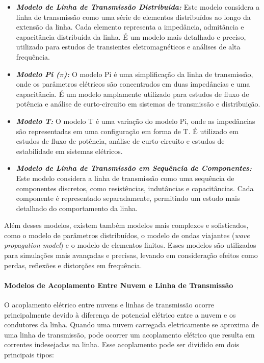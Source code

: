 \documentclass[a4paper, 12pt, onecolumn,singlespacing]{article}
\begin{document}
		\begin{itemize}
			\item \textbf{\textit{Modelo de Linha de Transmissão Distribuída:}} Este modelo considera a linha de transmissão como uma série de elementos distribuídos ao longo da extensão da linha. Cada elemento representa a impedância, admitância e capacitância distribuída da linha. É um modelo mais detalhado e preciso, utilizado para estudos de transientes eletromagnéticos e análises de alta frequência.
			
			\item \textbf{\textit{Modelo Pi ($\pi$):}} O modelo Pi é uma simplificação da linha de transmissão, onde os parâmetros elétricos são concentrados em duas impedâncias e uma capacitância. É um modelo amplamente utilizado para estudos de fluxo de potência e análise de curto-circuito em sistemas de transmissão e distribuição.
			
			\item \textbf{\textit{Modelo T:}} O modelo T é uma variação do modelo Pi, onde as impedâncias são representadas em uma configuração em forma de T. É utilizado em estudos de fluxo de potência, análise de curto-circuito e estudos de estabilidade em sistemas elétricos.
			
			\item \textbf{\textit{Modelo de Linha de Transmissão em Sequência de Componentes:}} Este modelo considera a linha de transmissão como uma sequência de componentes discretos, como resistências, indutâncias e capacitâncias. Cada componente é representado separadamente, permitindo um estudo mais detalhado do comportamento da linha.
		\end{itemize}
		
		Além desses modelos, existem também modelos mais complexos e sofisticados, como o modelo de parâmetros distribuídos, o modelo de ondas viajantes (\textit{wave propagation model}) e o modelo de elementos finitos. Esses modelos são utilizados para simulações mais avançadas e precisas, levando em consideração efeitos como perdas, reflexões e distorções em frequência.
		
		\paragraph{Modelos de Acoplamento Entre Nuvem e Linha de Transmissão}
		
		O acoplamento elétrico entre nuvens e linhas de transmissão ocorre principalmente devido à diferença de potencial elétrico entre a nuvem e os condutores da linha. Quando uma nuvem carregada eletricamente se aproxima de uma linha de transmissão, pode ocorrer um acoplamento elétrico que resulta em correntes indesejadas na linha. Esse acoplamento pode ser dividido em dois principais tipos:
		
\end{document}
